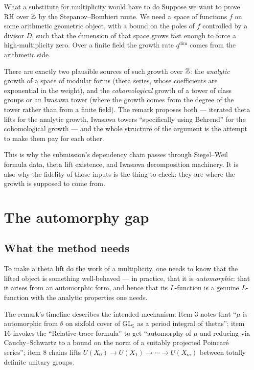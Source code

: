 \begin{deeper}{What a substitute for multiplicity would have to do}
Suppose we want to prove RH over $\mathbb{Z}$ by the Stepanov--Bombieri route. We need
a space of functions $f$ on some arithmetic geometric object, with a bound on
the poles of $f$ controlled by a divisor $D$, such that the dimension of that
space grows fast enough to force a high-multiplicity zero. Over a finite field
the growth rate $q^{\dim}$ comes from the arithmetic side.

There are exactly two plausible sources of such growth over $\mathbb{Z}$: the
\emph{analytic} growth of a space of modular forms (theta series, whose
coefficients are exponential in the weight), and the \emph{cohomological}
growth of a tower of class groups or an Iwasawa tower (where the growth comes
from the degree of the tower rather than from a finite field). The remark
proposes both --- iterated theta lifts for the analytic growth, Iwasawa towers
``specifically using Behrend'' for the cohomological growth --- and the whole
structure of the argument is the attempt to make them pay for each other.

This is why the submission's dependency chain passes through Siegel--Weil
formula data, theta lift existence, and Iwasawa decomposition machinery. It
is also why the fidelity of those inputs is the thing to check: they are where
the growth is supposed to come from.
\end{deeper}

\section{The automorphy gap}\subsection{What the method needs}To make a theta lift do the work of a multiplicity, one needs to know that the
lifted object is something well-behaved --- in practice, that it is
\emph{automorphic}: that it arises from an automorphic form, and hence that its
$L$-function is a genuine $L$-function with the analytic properties one needs.

The remark's timeline describes the intended mechanism. Item 3 notes that
``$\mu$ is automorphic from $\theta$ on sixfold cover of GL$_5$ as a period
integral of thetas''; item 16 invokes the ``Relative trace formula'' to get
``automorphy of $\mu$ and reducing via Cauchy--Schwartz to a bound on the norm
of a suitably projected Poincar\'e series''; item 8 chains lifts
$U(X_0) \to U(X_1) \to \cdots \to U(X_m)$ between totally definite unitary
groups.

